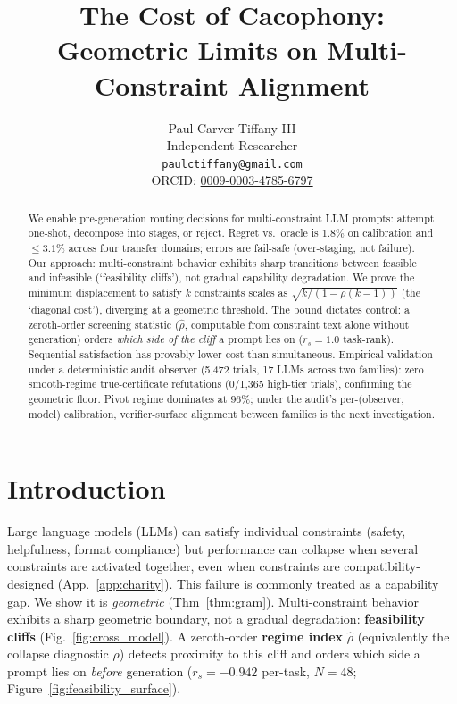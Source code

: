 \documentclass{article}
\title{The Cost of Cacophony:\\Geometric Limits on Multi-Constraint Alignment}
\author{%
  Paul Carver Tiffany III\\
  Independent Researcher\\
  \texttt{paulctiffany@gmail.com}\\
  ORCID: \href{https://orcid.org/0009-0003-4785-6797}{0009-0003-4785-6797}
}
\theoremstyle{plain}
\theoremstyle{definition}
\theoremstyle{remark}
\newcommand{\rhohat}{\hat{\rho}}
\newcommand{\appref}[1]{App.~\ref{#1}}
\begin{document}
\maketitle

\begin{abstract}
We enable pre-generation routing decisions for multi-constraint LLM prompts: attempt one-shot, decompose into stages, or reject. Regret vs.\ oracle is $1.8\%$ on calibration and $\le 3.1\%$ across four transfer domains; errors are fail-safe (over-staging, not failure).
Our approach: multi-constraint behavior exhibits sharp transitions between feasible and infeasible (`feasibility cliffs'), not gradual capability degradation.
We prove the minimum displacement to satisfy $k$ constraints scales as $\sqrt{k/(1{-}\rho(k{-}1))}$ (the `diagonal cost'), diverging at a geometric threshold. The bound dictates control: a zeroth-order screening statistic ($\rhohat$, computable from constraint text alone without generation) orders \emph{which side of the cliff} a prompt lies on ($r_s{=}1.0$ task-rank). Sequential satisfaction has provably lower cost than simultaneous.
Empirical validation under a deterministic audit observer (5{,}472 trials, 17 LLMs across two families): zero smooth-regime true-certificate refutations (0/1{,}365 high-tier trials), confirming the geometric floor. Pivot regime dominates at $96\%$; under the audit's per-(observer, model) calibration, verifier-surface alignment between families is the next investigation.
\end{abstract}

\section{Introduction}\label{sec:intro}

Large language models (LLMs) can satisfy individual constraints (safety, helpfulness, format compliance) but performance can collapse when several constraints are activated together, even when constraints are compatibility-designed (\appref{app:charity}). This failure is commonly treated as a capability gap. We show it is \emph{geometric} (Thm~\ref{thm:gram}). Multi-constraint behavior exhibits a sharp geometric boundary, not a gradual degradation: \textbf{feasibility cliffs} (Fig.~\ref{fig:cross_model}). A zeroth-order \textbf{regime index} $\rhohat$ (equivalently the collapse diagnostic $\hat{\rho}$) detects proximity to this cliff and orders which side a prompt lies on \emph{before} generation ($r_s{=}{-}0.942$ per-task, $N{=}48$; Figure~\ref{fig:feasibility_surface}).
\end{document}
